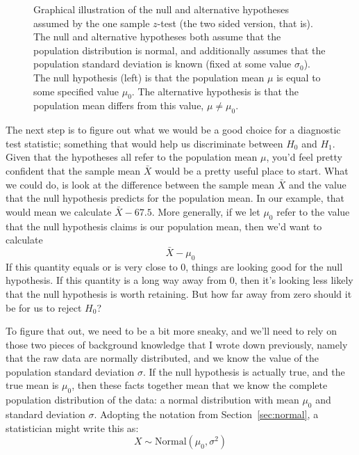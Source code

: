 \begin{figure}
\begin{center}
\caption{Graphical illustration of the null and alternative hypotheses assumed by the one sample $z$-test (the two sided version, that is). The null and alternative hypotheses both assume that the population distribution is normal, and additionally assumes that the population standard deviation is known (fixed at some value $\sigma_0$). The null hypothesis (left) is that the population mean $\mu$ is equal to some specified value $\mu_0$. The alternative hypothesis is that the population mean differs from this value, $\mu \neq \mu_0$.}
\HR
\label{fig:ztesthyp}
\end{center}
\end{figure}

The next step is to figure out what we would be a good choice for a diagnostic test statistic; something that would help us discriminate between $H_0$ and $H_1$. Given that the hypotheses all refer to the population mean $\mu$, you'd feel pretty confident that the sample mean $\bar{X}$ would be a pretty useful place to start. What we could do, is look at the difference between the sample mean $\bar{X}$ and the value that the null hypothesis predicts for the population mean. In our example, that would mean we calculate $\bar{X} - 67.5$. More generally, if we let $\mu_0$ refer to the value that the null hypothesis claims is our population mean, then we'd want to calculate
$$
\bar{X} - \mu_0
$$
If this quantity equals or is very close to 0, things are looking good for the null hypothesis. If this quantity is a long way away from 0, then it's looking less likely that the null hypothesis is worth retaining. But how far away from zero should it be for us to reject $H_0$? 

To figure that out, we need to be a bit more sneaky, and we'll need to rely on those two pieces of background knowledge that I wrote down previously, namely that the raw data are normally distributed, and we know the value of the population standard deviation $\sigma$. If the null hypothesis is actually true, and the true mean is $\mu_0$, then these facts together mean that we know the complete population distribution of the data: a normal distribution with mean $\mu_0$ and standard deviation $\sigma$. Adopting the notation from Section~\ref{sec:normal}, a statistician might write this as:
$$
X \sim \mbox{Normal}(\mu_0,\sigma^2)
$$


